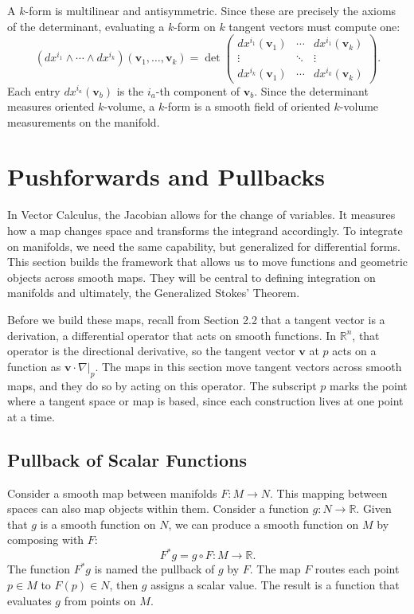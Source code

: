 \documentclass[12pt]{article}
\newcommand{\R}{\mathbb{R}}
\newcommand{\at}[2]{\left. #1 \right|_{#2}}
\newcommand{\bv}[1]{\mathbf{#1}}
\begin{document}
A $k$-form is multilinear and antisymmetric. Since these are precisely the axioms of the determinant, evaluating a $k$-form on $k$ tangent vectors must compute one:
\[
(dx^{i_1} \wedge \cdots \wedge dx^{i_k})(\bv{v}_1, \dots, \bv{v}_k) = \det \begin{pmatrix} dx^{i_1}(\bv{v}_1) & \cdots & dx^{i_1}(\bv{v}_k) \\ \vdots & \ddots & \vdots \\ dx^{i_k}(\bv{v}_1) & \cdots & dx^{i_k}(\bv{v}_k) \end{pmatrix}.
\]
Each entry $dx^{i_a}(\bv{v}_b)$ is the $i_a$-th component of $\bv{v}_b$. Since the determinant measures oriented $k$-volume, a $k$-form is a smooth field of oriented $k$-volume measurements on the manifold.

\section{Pushforwards and Pullbacks}

In Vector Calculus, the Jacobian allows for the change of variables. It measures how a map changes space and transforms the integrand accordingly. To integrate on manifolds, we need the same capability, but generalized for differential forms. This section builds the framework that allows us to move functions and geometric objects across smooth maps. They will be central to defining integration on manifolds and ultimately, the Generalized Stokes' Theorem.

Before we build these maps, recall from Section 2.2 that a tangent vector is a derivation, a differential operator that acts on smooth functions. In $\R^n$, that operator is the directional derivative, so the tangent vector $\bv{v}$ at $p$ acts on a function as $\bv{v} \cdot \at{\nabla}{p}$. The maps in this section move tangent vectors across smooth maps, and they do so by acting on this operator. The subscript $p$ marks the point where a tangent space or map is based, since each construction lives at one point at a time.

\subsection{Pullback of Scalar Functions}

Consider a smooth map between manifolds $F: M \to N$. This mapping between spaces can also map objects within them. Consider a function $g: N \to \R$. Given that $g$ is a smooth function on $N$, we can produce a smooth function on $M$ by composing with $F$:
\[
F^* g = g \circ F : M \to \R.
\]
The function $F^* g$ is named the pullback of $g$ by $F$. The map $F$ routes each point $p \in M$ to $F(p) \in N$, then $g$ assigns a scalar value. The result is a function that evaluates $g$ from points on $M$.
\end{document}
